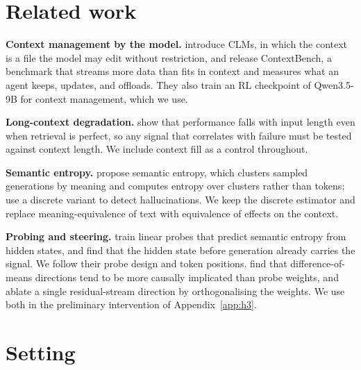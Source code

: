 \documentclass{article}
\begin{document}
\section{Related work}

\textbf{Context management by the model.} \citet{shao2026clm} introduce CLMs, in which the context is a file the model may edit without restriction, and release ContextBench, a benchmark that streams more data than fits in context and measures what an agent keeps, updates, and offloads.
They also train an RL checkpoint of Qwen3.5-9B for context management, which we use.

\textbf{Long-context degradation.} \citet{du2025context} show that performance falls with input length even when retrieval is perfect, so any signal that correlates with failure must be tested against context length.
We include context fill as a control throughout.

\textbf{Semantic entropy.} \citet{kuhn2023semantic} propose semantic entropy, which clusters sampled generations by meaning and computes entropy over clusters rather than tokens; \citet{farquhar2024detecting} use a discrete variant to detect hallucinations.
We keep the discrete estimator and replace meaning-equivalence of text with equivalence of effects on the context.

\textbf{Probing and steering.} \citet{kossen2024sep} train linear probes that predict semantic entropy from hidden states, and find that the hidden state before generation already carries the signal.
We follow their probe design and token positions.
\citet{marks2023geometry} find that difference-of-means directions tend to be more causally implicated than probe weights, and \citet{arditi2024refusal} ablate a single residual-stream direction by orthogonalising the weights.
We use both in the preliminary intervention of Appendix~\ref{app:h3}.

\section{Setting}
\label{sec:setting}
\end{document}
